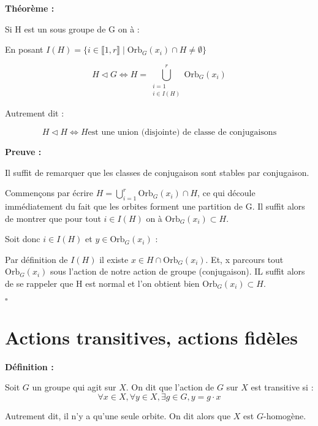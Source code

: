 \documentclass{report}
\renewenvironment{leftbar}{%
  \def\FrameCommand{\vrule width 0.4pt \hspace{10pt}}%
  \MakeFramed {\advance\hsize-\width \FrameRestore}}%
 {\endMakeFramed}%
\newenvironment{definition}[1][]{
    \begin{tcolorbox}[colframe= white]
    \textbf{Définition :} 
    #1 \par
    }
    {\end{tcolorbox}}
\newenvironment{preuve}{\vspace*{0.5cm}
    \begin{leftbar}
    \noindent\textbf{Preuve :}\par}{
    \begin{flushright}
    $\square$
    \end{flushright}
    \end{leftbar}
}
\newenvironment{theoreme}[1][]{
    \begin{tcolorbox}[]
    \textbf{Théorème :} #1  \par} 
    {\end{tcolorbox}}
\newcommand{\dsp}{\displaystyle}
\newcommand{\orb}{\text{Orb}}
\begin{document}
\begin{theoreme}
Si H est un sous groupe de G on à :\par
En posant \( I(H) = \{ i\in \llbracket  1,r\rrbracket  \mid \orb_{G}(x_{i}) \cap H \neq \emptyset \} \)
\begin{center}
\[
H \triangleleft G \Longleftrightarrow H = \bigcup_{\substack{i=1 \\ i \in I(H)}}^{r} \orb_{G}(x_{i})
\]
\end{center}
Autrement dit :
\begin{center}
\[ H\triangleleft H \Longleftrightarrow H\text{est une union (disjointe) de classe de conjugaisons} \]
\end{center}
\end{theoreme}

\begin{preuve}
\fbox{$\Leftarrow$}\par 
Il suffit de remarquer que les classes de conjugaison sont stables par conjugaison.\par 

\fbox{$\Rightarrow$}\par
Commençons par écrire  $\dsp H = \bigcup_{i=1}^{r}\orb_{G}(x_{i})\cap H$, ce qui découle immédiatement du fait que les orbites forment une partition de G. Il suffit alors de montrer que pour tout $i\in I(H)$ on à $\orb_{G}(x_{i})\subset H$.\par 
Soit donc $i\in I(H)$ et $y\in \orb_{G}(x_{i})$ :\par 
Par définition de $I(H)$ il existe $x\in H \cap \orb_{G}(x_{i})$. Et, x parcours tout $\orb_{G}(x_{i})$ sous l'action de notre action de groupe (conjugaison). IL suffit alors de se rappeler que H est normal et l'on obtient bien $\orb_{G}(x_{i})\subset H$.
\end{preuve}

\section{Actions transitives, actions fidèles}

\begin{definition} 
Soit $G$ un groupe qui agit sur $X$. On dit que l'action de $G$ sur $X$ est transitive si :
$$\forall x \in X, \forall y \in X, \exists g \in G, y = g\cdot x$$
\end{definition} 

Autrement dit, il n'y a qu'une seule orbite. On dit alors que $X$ est $G$-homogène.
\end{document}
